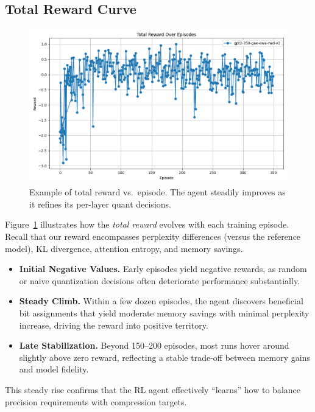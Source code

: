 \documentclass{article}
\begin{document}
	\subsection{Total Reward Curve}
	\begin{figure}[ht]
	\centering
	\includegraphics[width=\columnwidth]{gpt2-350-gae-ewa-rwd-v2-reward.png}
	\vspace{-1em}
	\caption{\small Example of total reward vs.\ episode. The agent steadily improves as it refines its per-layer quant decisions.}
	\label{fig:reward_curves}
	\vspace{-0.2em}
	\end{figure}	
	Figure~\ref{fig:reward_curves} illustrates how the \emph{total reward} evolves with each training episode. Recall that our reward encompasses perplexity differences (versus the reference model), KL divergence, attention entropy, and memory savings. 
	\begin{itemize}
		\item \textbf{Initial Negative Values.} Early episodes yield negative rewards, as random or naive quantization decisions often deteriorate performance substantially.
		\item \textbf{Steady Climb.} Within a few dozen episodes, the agent discovers beneficial bit assignments that yield moderate memory savings with minimal perplexity increase, driving the reward into positive territory.
		\item \textbf{Late Stabilization.} Beyond 150--200 episodes, most runs hover around slightly above zero reward, reflecting a stable trade-off between memory gains and model fidelity.
	\end{itemize}
	This steady rise confirms that the RL agent effectively “learns” how to balance precision requirements with compression targets.
	
\end{document}
